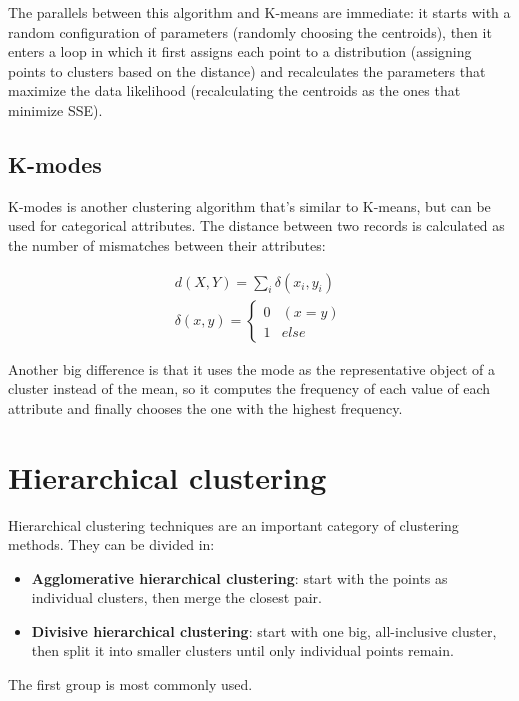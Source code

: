 The parallels between this algorithm and K-means are immediate: it starts with a random configuration of parameters (randomly choosing the centroids), then it enters a loop in which it first assigns each point to a distribution (assigning points to clusters based on the distance) and recalculates the parameters that maximize the data likelihood (recalculating the centroids as the ones that minimize SSE).

\subsection{K-modes}

K-modes is another clustering algorithm that's similar to K-means, but can be used for categorical attributes. The distance between two records is calculated as the number of mismatches between their attributes:

\begin{gather*}
    d(X,Y) = \sum_i \delta(x_i, y_i) \\
    \delta(x,y) = \begin{cases}
        0 & (x = y) \\
        1 & else
    \end{cases}
\end{gather*}

Another big difference is that it uses the mode as the representative object of a cluster instead of the mean, so it computes the frequency of each value of each attribute and finally chooses the one with the highest frequency.

\section{Hierarchical clustering}

Hierarchical clustering techniques are an important category of clustering methods. They can be divided in:

\begin{itemize}
    \item \textbf{Agglomerative hierarchical clustering}: start with the points as individual clusters, then merge the closest pair.

    \item \textbf{Divisive hierarchical clustering}: start with one big, all-inclusive cluster, then split it into smaller clusters until only individual points remain.
\end{itemize}

The first group is most commonly used.

